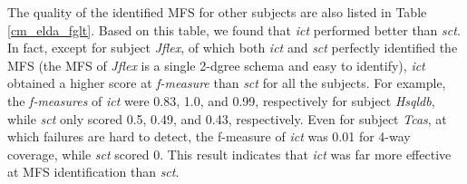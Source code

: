 \documentclass[10pt,journal,compsoc]{IEEEtran}
\begin{document}
%



The quality of the identified MFS for other subjects are also listed in Table \ref{cm_elda_fglt}. Based on this table, we found that \emph{ict} performed better than \emph{sct}. In fact, except for subject \emph{Jflex}, of which both \emph{ict} and \emph{sct} perfectly identified the MFS (the MFS of \emph{Jflex} is a single 2-dgree schema and easy to identify), \emph{ict} obtained a higher score at \emph{f-measure} than \emph{sct} for all the subjects. For example, the  \emph{f-measures} of \emph{ict} were 0.83, 1.0, and 0.99, respectively for subject \emph{Hsqldb}, while \emph{sct} only scored 0.5, 0.49, and 0.43, respectively. Even for subject \emph{Tcas}, at which failures are hard to detect, the f-measure of \emph{ict} was 0.01 for 4-way coverage, while \emph{sct} scored 0. This result indicates that \emph{ict} was far more effective at MFS identification than \emph{sct}.






\end{document}

